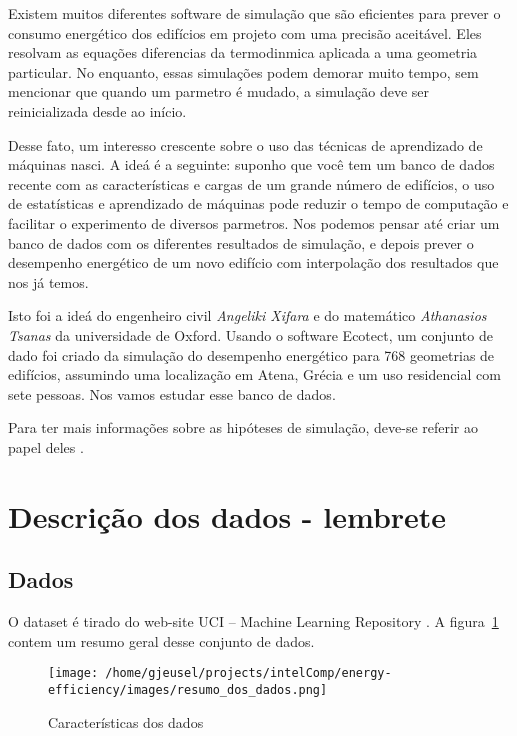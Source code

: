 \documentclass[paper=a4, fontsize=11pt]{article} %
\numberwithin{equation}{section} %
\numberwithin{figure}{section} %
\numberwithin{table}{section} %
\begin{document}
Existem muitos diferentes software de simulação que são eficientes para prever o consumo energético dos edifícios em projeto com uma precisão aceitável.
Eles resolvam as equações diferencias da termodinmica aplicada a uma geometria particular.
No enquanto, essas simulações podem demorar muito tempo, sem mencionar que quando um parmetro é mudado, a simulação deve ser reinicializada desde ao início.

Desse fato, um interesso crescente sobre o uso das técnicas de aprendizado de máquinas nasci.
A ideá é a seguinte: suponho que você tem um banco de dados recente com as características e cargas de um grande número de edifícios,
o uso de estatísticas e aprendizado de máquinas pode reduzir o tempo de computação e facilitar o experimento de diversos parmetros.
Nos podemos pensar até criar um banco de dados com os diferentes resultados de simulação,
e depois prever o desempenho energético de um novo edifício com interpolação dos resultados que nos já temos.

Isto foi a ideá do engenheiro civil \emph{Angeliki Xifara} e do matemático \emph{Athanasios Tsanas} da universidade de Oxford.
Usando o software Ecotect, um conjunto de dado foi criado da simulação do desempenho energético para 768 geometrias de edifícios,
assumindo uma localização em Atena, Grécia e um uso residencial com sete pessoas.
Nos vamos estudar esse banco de dados.

Para ter mais informações sobre as hipóteses de simulação, deve-se referir ao papel deles \cite{ref_Athanasios}.


\newpage
\section{Descrição dos dados - lembrete}

\subsection{Dados}
O dataset é tirado do web-site UCI – Machine Learning Repository \cite{ref_UCI}.
A figura~\ref{dados_resumo} contem um resumo geral desse conjunto de dados.

\begin{figure}[H] %
\begin{center}
\texttt{[image: /home/gjeusel/projects/intelComp/energy-efficiency/images/resumo\_dos\_dados.png]}
\end{center}
\caption{Características dos dados}
\label{dados_resumo}
\end{figure}
\end{document}
